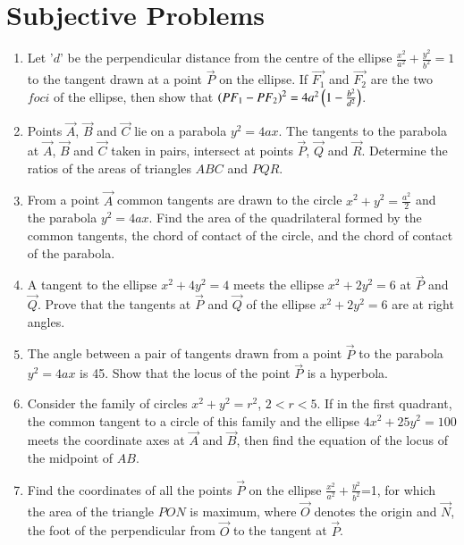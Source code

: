 \documentclass[journal]{IEEEtran}
\numberwithin{equation}{enumi}
\numberwithin{figure}{enumi}
\begin{document}
\section{Subjective Problems}
\begin{enumerate}
\item Let '$d$' be the perpendicular distance from the centre of the ellipse $\frac{x^2}{a^2}+\frac{y^2}{b^2}=1$ to the tangent drawn at a point $\vec{P}$ on the ellipse. If $\vec{F_1}$ and $\vec{F_2}$ are the two $foci$ of the ellipse, then show that $\left(PF_1-PF_2\right)^2=4a^2\left(1-\frac{b^2}{d^2}\right)$. \hfill{}

\item Points $\vec{A}$, $\vec{B}$ and $\vec{C}$ lie on a parabola $y^2=4ax$. The tangents to the parabola at $\vec{A}$, $\vec{B}$ and $\vec{C}$ taken in pairs, intersect at points $\vec{P}$, $\vec{Q}$ and $\vec{R}$. Determine the ratios of the areas of triangles $ABC$ and $PQR$. \hfill{}

\item From a point $\vec{A}$ common tangents are drawn to the circle $x^2+y^2=\frac{a^2}{2}$ and the parabola $y^2=4ax$. Find the area of the quadrilateral formed by the common tangents, the chord of contact of the circle, and the chord of contact of the parabola. \hfill{}

\item A tangent to the ellipse $x^2+4y^2=4$ meets the ellipse $x^2+2y^2=6$ at $\vec{P}$ and $\vec{Q}$. Prove that the tangents at $\vec{P}$ and $\vec{Q}$ of the ellipse $x^2+2y^2=6$ are at right angles. \hfill{}

\item The angle between a pair of tangents drawn from a point $\vec{P}$ to the parabola $y^2=4ax$ is 45\degree. Show that the locus of the point $\vec{P}$ is a hyperbola. \hfill{}

\item Consider the family of circles $x^2+y^2=r^2$, $2<r<5$. If in the first quadrant, the common tangent to a circle of this family and the ellipse $4x^2+25y^2=100$ meets the coordinate axes at $\vec{A}$ and $\vec{B}$, then find the equation of the locus of the midpoint of $AB$. \hfill{}

\item Find the coordinates of all the points $\vec{P}$ on the ellipse $\frac{x^2}{a^2}+\frac{y^2}{b^2}$=1, for which the area of the triangle $PON$ is maximum, where $\vec{O}$ denotes the origin and $\vec{N}$, the foot of the perpendicular from $\vec{O}$ to the tangent at $\vec{P}$. \hfill{}


\end{enumerate}
\end{document}
